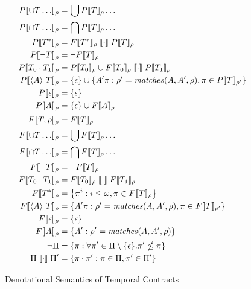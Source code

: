 \begin{figure}
 \begin{align*}
   \denotetcone{\stOr{\mtcon \ldots}}{\menv} &= \bigcup\denotetcone{\mtcon}{\menv}\ldots
\\
    \denotetcone{\stAnd{\mtcon \ldots}}{\menv} &= \bigcap\denotetcone{\mtcon}{\menv}\ldots
\\
    \denotetcone{\stmany{\mtcon}}{\menv} &= \denotetconfulle{\stmany{\mtcon}}{\menv} \semseq \denotetcone{\mtcon}{\menv}
\\
    \denotetcone{\stnot{\mtcon}}{\menv} &= \semneg{\denotetconfulle{\mtcon}{\menv}}
\\
    \denotetcone{\stseq{\mtcon_0}{\mtcon_1}}{\menv} &= \denotetcone{\mtcon_0}{\menv} \cup \denotetconfulle{\mtcon_0}{\menv}\semseq \denotetcone{\mtcon_1}{\menv}
\\
    \denotetcone{\stbind{\mevent}{\mtcon}}{\menv} &= \setof{\epsilon} \cup \setbuild{\mevent' \mtrace}{\menv' = \matches(\mevent, \mevent', \menv), \mtrace \in \denotetcone{\mtcon}{\menv'}}
\\
    \denotetcone{\epsilon}{\menv} &= \setof{\epsilon}
\\
    \denotetcone{\mevent}{\menv} &= \setof{\epsilon} \cup \denotetconfulle{\mevent}{\menv}
\\[2pt]
    \denotetconfulle{\mtcon,\menv}{\menv} &= \denotetconfulle{\mtcon}{\menv}
\\
    \denotetconfulle{\stOr{\mtcon \ldots}}{\menv} &= \bigcup\denotetconfulle{\mtcon}{\menv}\ldots
\\
    \denotetconfulle{\stAnd{\mtcon \ldots}}{\menv} &= \bigcap\denotetconfulle{\mtcon}{\menv}\ldots
\\
    \denotetconfulle{\stnot{\mtcon}}{\menv} &= \semneg{\denotetconfulle{\mtcon}{\menv}}
\\
    \denotetconfulle{\stseq{\mtcon_0}{\mtcon_1}}{\menv} &= \denotetconfulle{\mtcon_0}{\menv} \semseq \denotetconfulle{\mtcon_1}{\menv}
\\
    \denotetconfulle{\stmany{\mtcon}}{\menv} &= \setbuild{\mtrace^i}{i \le \omega, \mtrace \in \denotetconfulle{\mtcon}{\menv}}
\\
    \denotetconfulle{\stbind{\mevent}{\mtcon}}{\menv} &= \setbuild{\mevent' \mtrace}{\menv' = \matches(\mevent, \mevent', \menv), \mtrace \in \denotetconfulle{\mtcon}{\menv'}}
\\
    \denotetconfulle{\epsilon}{\menv} &= \setof{\epsilon}
\\
    \denotetconfulle{\mevent}{\menv} &= \setbuild{\mevent'}{\menv' = \matches(\mevent, \mevent', \menv)}
\\[2pt]
    \semneg{\Pi} &= \setbuild{\mtrace}{\forall \mtrace' \in \Pi\setminus\setof{\epsilon}. \mtrace' \nleq \mtrace}
\\
    \Pi \semseq \Pi' &= \setbuild{\mtrace \cdot \mtrace'}{\mtrace \in \Pi, \mtrace' \in \Pi'}
 \end{align*}
  \caption{Denotational Semantics of Temporal Contracts}
  \label{fig:tcontract-denotation}
\end{figure}

